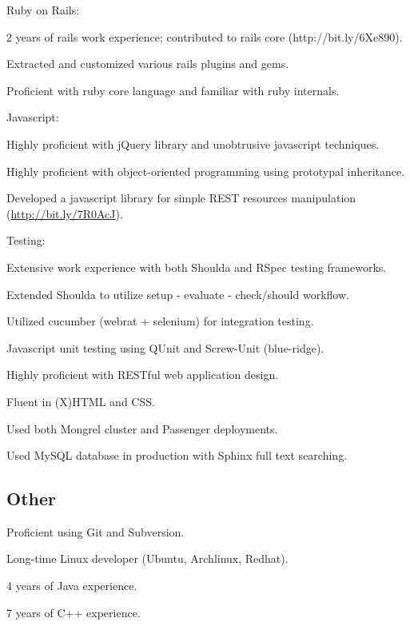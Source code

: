 \documentclass{resume}
\begin{document}
\begin{compactitem}
  \item Ruby on Rails:
    \begin{compactitem}
      \item 2 years of rails work experience; contributed to rails core \mbox{(http://bit.ly/6Xe890)}.
      \item Extracted and customized various rails plugins and gems.
      \item Proficient with ruby core language and familiar with ruby internals.
    \end{compactitem}

  \item Javascript:
    \begin{compactitem}
      \item Highly proficient with jQuery library and unobtrusive javascript techniques.
      \item Highly proficient with object-oriented programming using prototypal inheritance.
      \item Developed a javascript library for simple REST resources manipulation \mbox{(\url{http://bit.ly/7R0AcJ})}.
    \end{compactitem}

  \item Testing:
    \begin{compactitem}
      \item Extensive work experience with both Shoulda and RSpec testing frameworks.
      \item Extended Shoulda to utilize setup - evaluate - check/should workflow.
      \item Utilized cucumber (webrat + selenium) for integration testing.
      \item Javascript unit testing using QUnit and Screw-Unit (blue-ridge).
    \end{compactitem}

  \item Highly proficient with RESTful web application design.
  \item Fluent in (X)HTML and CSS.
  \item Used both Mongrel cluster and Passenger deployments.
  \item Used MySQL database in production with Sphinx full text searching.
\end{compactitem}

\subsection{Other}
\begin{compactitem}
  \item Proficient using Git and Subversion.
  \item Long-time Linux developer (Ubuntu, Archlinux, Redhat).
  \item 4 years of Java experience.
  \item 7 years of C++ experience.
\end{compactitem}
\end{document}
